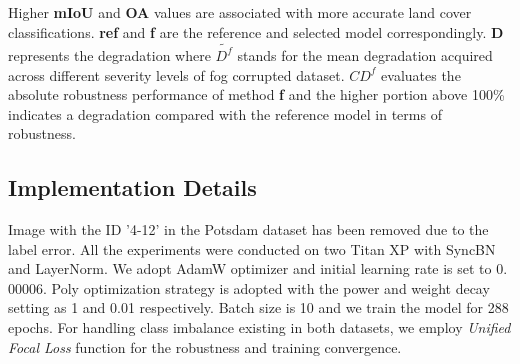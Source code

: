 \documentclass[lettersize,journal]{IEEEtran}
\begin{document}
Higher \textbf{mIoU} and \textbf{OA} values are associated with more accurate land cover classifications. \textbf{ref} and \textbf{f} are the reference and selected model correspondingly. \textbf{D} represents the degradation where $\widetilde{D^{f}}$ stands for the mean degradation acquired across different severity levels of fog corrupted dataset. \textbf{$CD^{f}$} evaluates the absolute robustness performance of method \textbf{f} and the higher portion above 100\% indicates a degradation compared with the reference model in terms of robustness.

\subsection{Implementation Details}
Image with the ID '4-12' in the Potsdam dataset has been removed due to the label error.  All the experiments were conducted on two Titan XP with SyncBN and LayerNorm. We adopt AdamW optimizer and initial learning rate is set to 0. 00006. Poly optimization strategy is adopted with the power and weight decay setting as 1 and 0.01 respectively. Batch size is 10 and we train the model for 288 epochs. For handling class imbalance existing in both datasets, we employ \emph{Unified Focal Loss} \cite{yeungUnifiedFocalLoss2022} function for the robustness and training convergence. 
\end{document}
